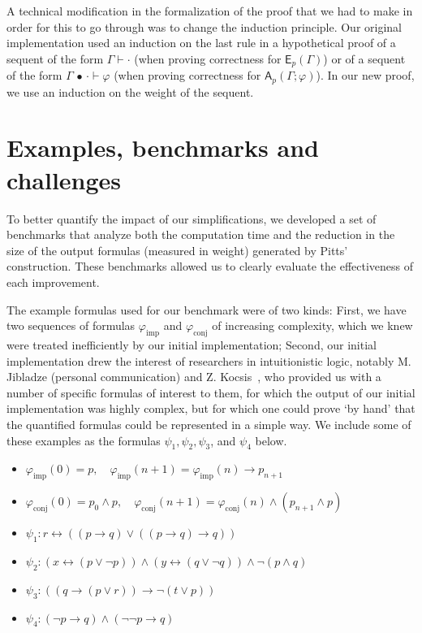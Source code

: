 \documentclass[english,review]{jflart}
\theoremstyle{definition}
\theoremstyle{plain}
\newcommand{\Ap}[1]{\mathsf{A}_{p}(#1)}
\newcommand{\Ep}[1]{\mathsf{E}_{p}(#1)}
\renewcommand{\phi}{\varphi}
\newcommand{\cons}{\,\bullet\,}
\begin{document}
A technical modification in the formalization of the proof that we had to make in order for this to go through was to change the induction principle. Our original implementation used an induction on the last rule in a hypothetical proof of a sequent of the form $\Gamma \vdash \cdot$ (when proving correctness for $\Ep{\Gamma}$) or of a sequent of the form $\Gamma \cons \cdot \vdash \phi$ (when proving correctness for $\Ap{\Gamma; \phi}$). In our new proof, we use an induction on the weight of the sequent.






\section{Examples, benchmarks and challenges}\label{sec:benchmarks}
To better quantify the impact of our simplifications, we developed a set of benchmarks that analyze both the computation time and the reduction 
in the size of the output formulas (measured in weight) generated by Pitts' construction. These benchmarks allowed us to clearly evaluate the 
effectiveness of each improvement.

The example formulas used for our benchmark were of two kinds: First, we have two sequences of formulas $\phi_{\text{imp}}$ and $\phi_{\text{conj}}$ of increasing complexity, which we knew were treated inefficiently by our initial implementation; Second, our initial implementation drew the interest of researchers in intuitionistic logic, notably M. Jibladze (personal communication) and Z. Kocsis~\cite{Koc2023}, who provided us with a number of specific formulas of interest to them, for which the output of our initial implementation was highly complex, but for which one could prove `by hand' that the quantified formulas could be represented in a simple way. We include some of these examples as the formulas $\psi_1, \psi_2, \psi_3$, and $\psi_4$ below.


\begin{itemize} \label{def:test-formulas}
	\item $\phi_{\text{imp}}(0) = p, \quad \phi_{\text{imp}}(n+1) = \phi_{\text{imp}}(n) \rightarrow p_{n+1}$
	\item $\phi_{\text{conj}}(0) = p_0 \wedge p, \quad \phi_{\text{conj}}(n+1) = \phi_{\text{conj}}(n) \wedge (p_{n+1} \wedge p)$
	\item $\psi_1: r \leftrightarrow ((p \rightarrow q) \vee ((p \rightarrow q) \rightarrow q))$
	\item $\psi_2: (x \leftrightarrow (p \vee \lnot p)) \wedge (y \leftrightarrow (q \vee \lnot q)) \wedge \lnot (p \wedge q)$
	\item $\psi_3: ((q\rightarrow (p \vee r))\rightarrow \lnot (t \vee p))$
	\item $\psi_4: (\neg p \to q) \wedge (\neg \neg p \to q)$
\end{itemize}
\end{document}
